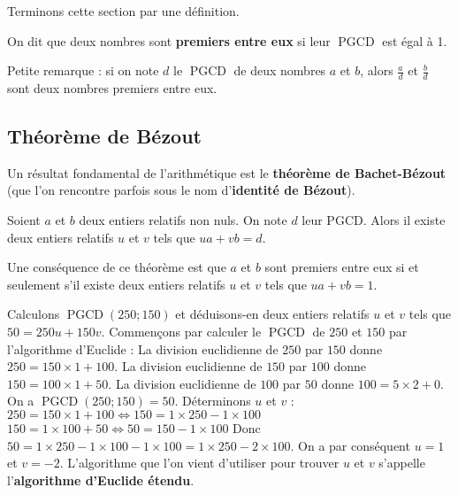 	Terminons cette section par une définition.
	
	\begin{formula}
		On dit que deux nombres sont \textbf{premiers entre eux} si leur $\operatorname{PGCD}$ est égal à 1.
	\end{formula}
	
	\begin{tip}
		Petite remarque : si on note $d$ le $\operatorname{PGCD}$ de deux nombres $a$ et $b$, alors $\frac{a}{d}$ et $\frac{b}{d}$ sont deux nombres premiers entre eux.
	\end{tip}
	
	\subsection{Théorème de Bézout}
	
	Un résultat fondamental de l'arithmétique est le \textbf{théorème de Bachet-Bézout} (que l'on rencontre parfois sous le nom d'\textbf{identité de Bézout}).
	
	\begin{formula}
		Soient $a$ et $b$ deux entiers relatifs non nuls. On note $d$ leur PGCD. Alors il existe deux entiers relatifs $u$ et $v$ tels que $ua + vb = d$.
	\end{formula}
	
	\begin{formula}
		Une conséquence de ce théorème est que $a$ et $b$ sont premiers entre eux si et seulement s'il existe deux entiers relatifs $u$ et $v$ tels que $ua + vb = 1$.
	\end{formula}
	
	\begin{tip}[Exemple]
		Calculons $\operatorname{PGCD}(250; 150)$ et déduisons-en deux entiers relatifs $u$ et $v$ tels que $50 = 250u + 150v$.
		Commençons par calculer le $\operatorname{PGCD}$ de $250$ et $150$ par l'algorithme d'Euclide :
		\newpar
		La division euclidienne de $250$ par $150$ donne $250 = 150 \times 1 + 100$.
		\newline
		La division euclidienne de $150$ par $100$ donne $150 = 100 \times 1 + 50$.
		\newline
		La division euclidienne de $100$ par $50$ donne $100 = 5 \times 2 + 0$.
		\newpar
		On a $\operatorname{PGCD}(250;150) = 50$. Déterminons $u$ et $v$ :
		\newpar
		$250 = 150 \times 1 + 100 \iff 150 = 1 \times 250 - 1 \times 100$
		\newline
		$150 = 1 \times 100 + 50 \iff 50 = 150 - 1 \times 100$
		\newpar
		Donc $50 = 1 \times 250 - 1 \times 100 - 1 \times 100 = 1 \times 250 - 2 \times 100$.
		\newpar
		On a par conséquent $u = 1$ et $v = -2$. L'algorithme que l'on vient d'utiliser pour trouver $u$ et $v$ s'appelle l'\textbf{algorithme d'Euclide étendu}.
	\end{tip}
	

